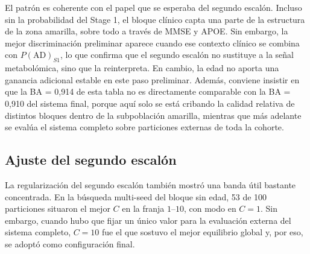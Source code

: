 \begin{table}[ht]
\centering
\caption{Cribado preliminar de bloques candidatos para el Stage 2 dentro de la subpoblación amarilla. Las BA son medias de RSKF $5\times10$ en esa subpoblación.}
\label{tab:stage2_candidate_sets}
\small
\setlength{\tabcolsep}{4pt}
\end{table}

El patrón es coherente con el papel que se esperaba del segundo escalón. Incluso sin la probabilidad del Stage 1, el
bloque clínico capta una parte de la estructura de la zona amarilla, sobre todo a través de MMSE y APOE. Sin embargo,
la mejor discriminación preliminar aparece cuando ese contexto clínico se combina con $P(\text{AD})_{S1}$, lo que
confirma que el segundo escalón no sustituye a la señal metabolómica, sino que la reinterpreta. En cambio, la edad no
aporta una ganancia adicional estable en este paso preliminar. Además, conviene insistir en que la BA = 0,914 de esta
tabla no es directamente comparable con la BA = 0,910 del sistema final, porque aquí solo se está cribando la calidad
relativa de distintos bloques dentro de la subpoblación amarilla, mientras que más adelante se evalúa el sistema
completo sobre particiones externas de toda la cohorte.

\subsection{Ajuste del segundo escalón}

La regularización del segundo escalón también mostró una banda útil bastante concentrada. En la búsqueda multi-seed del
bloque sin edad, 53 de 100 particiones situaron el mejor $C$ en la franja $1$--$10$, con modo en $C=1$. Sin embargo,
cuando hubo que fijar un único valor para la evaluación externa del sistema completo, $C=10$ fue el que sostuvo el mejor
equilibrio global y, por eso, se adoptó como configuración final.


